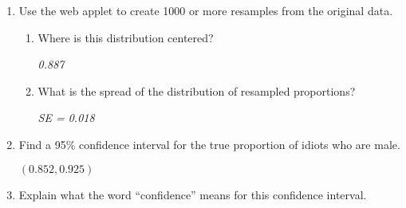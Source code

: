 \begin{enumerate}
\begin{enumerate}
\begin{enumerate}
\begin{key} 
  {$0.887$}
\end{key}
       \item After resampling 318 individuals, what number do you compute?
\begin{students}
    \vspace{1.2cm}    
\end{students}

\begin{key} 
  {\it  The proportion of the 318 new draws which are male.}
\end{key}
     \end{enumerate}
     \item Use the  web applet to create  1000 or more
       resamples from the original data. 
       \begin{enumerate}
         \item Where is this distribution centered?
\begin{students}
    \vspace{.7cm}    
\end{students}

\begin{key} 
  {\it  0.887}
\end{key}
         \item What is the spread of the distribution of resampled proportions?
\begin{students}
    \vspace{.7cm}    
\end{students}

\begin{key} 
  {\it SE =  0.018}
\end{key}
         \end{enumerate}
     \item Find a 95\% confidence interval for the true proportion of
       idiots who are male.
\begin{students}
    \vspace{1.2cm}    
\end{students}

\begin{key} 
  $  (0.852, 0.925)$
\end{key}
     \item \label{longRun}Explain what the word ``confidence'' means for this
       confidence interval.
\begin{students}
    \vspace{3cm}    
\end{students}


\end{enumerate}
\end{enumerate}
